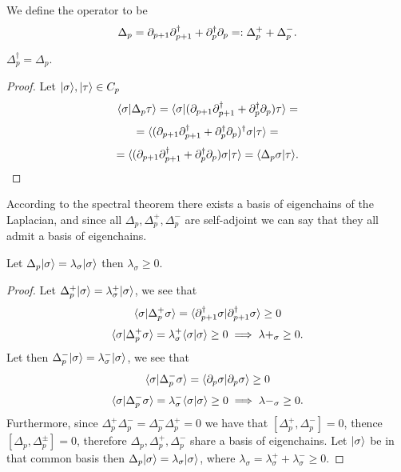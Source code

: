\documentclass[../1.tex]{subfiles}
\begin{document}
    
    \begin{defn}
        We define the  operator to be 
        \[ \Delta_p = \partial_{p+1}\partial^\dagger_{p+1} + \partial^\dagger_p\partial_p =: \Delta^+_p + \Delta^-_p.\]
    \end{defn}

    \begin{prop}
        $\Delta^\dagger_p = \Delta_p.$
    \end{prop}
    \begin{proof}
        Let $| \sigma \rangle, | \tau \rangle \in C_p$ 
        \[ \langle \sigma | \Delta_p\tau \rangle=\langle \sigma | (\partial_{p+1}\partial^\dagger_{p+1} + \partial^\dagger_p\partial_p)\tau \rangle = \]
        \[ = \langle (\partial_{p+1}\partial^\dagger_{p+1} + \partial^\dagger_p\partial_p)^\dagger\sigma | \tau \rangle = \]
        \[ = \langle (\partial_{p+1}\partial^\dagger_{p+1} + \partial^\dagger_p\partial_p)\sigma | \tau \rangle = \langle \Delta_p\sigma | \tau \rangle. \]
    \end{proof}
    According to the spectral theorem there exists a basis of eigenchains of the Laplacian, and since all $\Delta_p, \Delta^+_p, \Delta^-_p$
    are self-adjoint we can say that they all admit a basis of eigenchains.

    \begin{prop}
        Let $\Delta_p| \sigma \rangle = \lambda_\sigma| \sigma \rangle$ then $\lambda_\sigma \geq 0$.
    \end{prop}
    \begin{proof}
        Let $\Delta^+_p| \sigma \rangle = \lambda^+_\sigma | \sigma \rangle$, we see that
        \[ \langle \sigma | \Delta^+_p\sigma \rangle = \langle \partial^\dagger_{p+1}\sigma | \partial^\dagger_{p+1}\sigma \rangle \geq 0 \]
        \[ \langle \sigma | \Delta^+_p\sigma \rangle = \lambda^+_\sigma\langle \sigma | \sigma \rangle \geq 0 \implies \lambda+_\sigma \geq 0.\]
        Let then $\Delta^-_p| \sigma \rangle = \lambda^-_\sigma | \sigma \rangle$, we see that
        \[ \langle \sigma | \Delta^-_p\sigma \rangle = \langle \partial_p\sigma | \partial_p\sigma \rangle \geq 0 \]
        \[ \langle \sigma | \Delta^-_p\sigma \rangle = \lambda^-_\sigma\langle \sigma | \sigma \rangle \geq 0 \implies \lambda-_\sigma \geq 0.\]
        Furthermore, since $\Delta^+_p\Delta^-_p = \Delta^-_p\Delta^+_p = 0$ we have that $[\Delta^+_p,\Delta^-_p] = 0$, thence
        $[\Delta_p, \Delta^\pm_p] = 0$, therefore $\Delta_p, \Delta^+_p, \Delta^-_p$ share a basis of eigenchains.
        Let $| \sigma \rangle$ be in that common basis then $\Delta_p| \sigma \rangle = \lambda_\sigma| \sigma \rangle$, where
        $\lambda_\sigma = \lambda^+_\sigma + \lambda^-_\sigma \geq 0$.
    \end{proof}
\end{document}
